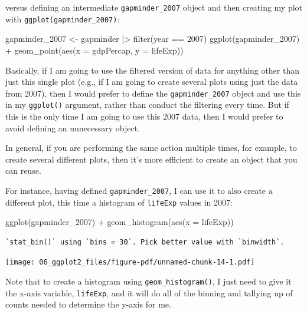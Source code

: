 \documentclass[
  letterpaper,
  DIV=11,
  numbers=noendperiod]{scrreprt}
\newenvironment{Shaded}{\begin{snugshade}}{\end{snugshade}}
\newcommand{\AttributeTok}[1]{\textcolor[rgb]{0.40,0.45,0.13}{#1}}
\newcommand{\DecValTok}[1]{\textcolor[rgb]{0.68,0.00,0.00}{#1}}
\newcommand{\FunctionTok}[1]{\textcolor[rgb]{0.28,0.35,0.67}{#1}}
\newcommand{\NormalTok}[1]{\textcolor[rgb]{0.00,0.23,0.31}{#1}}
\newcommand{\OtherTok}[1]{\textcolor[rgb]{0.00,0.23,0.31}{#1}}
\newcommand{\SpecialCharTok}[1]{\textcolor[rgb]{0.37,0.37,0.37}{#1}}
\begin{document}
versus defining an intermediate \texttt{gapminder\_2007} object and then
creating my plot with \texttt{ggplot(gapminder\_2007)}:

\begin{Shaded}
\begin{Highlighting}[]
\NormalTok{gapminder\_2007 }\OtherTok{\textless{}{-}}\NormalTok{ gapminder }\SpecialCharTok{|\textgreater{}} \FunctionTok{filter}\NormalTok{(year }\SpecialCharTok{==} \DecValTok{2007}\NormalTok{)}
\FunctionTok{ggplot}\NormalTok{(gapminder\_2007) }\SpecialCharTok{+}
  \FunctionTok{geom\_point}\NormalTok{(}\FunctionTok{aes}\NormalTok{(}\AttributeTok{x =}\NormalTok{ gdpPercap, }\AttributeTok{y =}\NormalTok{ lifeExp))}
\end{Highlighting}
\end{Shaded}

Basically, if I am going to use the filtered version of data for
anything other than just this single plot (e.g., if I am going to create
several plots using just the data from 2007), then I would prefer to
define the \texttt{gapminder\_2007} object and use this in my
\texttt{ggplot()} argument, rather than conduct the filtering every
time. But if this is the only time I am going to use this 2007 data,
then I would prefer to avoid defining an unnecessary object.

In general, if you are performing the same action multiple times, for
example, to create several different plots, then it's more efficient to
create an object that you can reuse.

For instance, having defined \texttt{gapminder\_2007}, I can use it to
also create a different plot, this time a histogram of \texttt{lifeExp}
values in 2007:

\begin{Shaded}
\begin{Highlighting}[]
\FunctionTok{ggplot}\NormalTok{(gapminder\_2007) }\SpecialCharTok{+}
  \FunctionTok{geom\_histogram}\NormalTok{(}\FunctionTok{aes}\NormalTok{(}\AttributeTok{x =}\NormalTok{ lifeExp))}
\end{Highlighting}
\end{Shaded}

\begin{verbatim}
`stat_bin()` using `bins = 30`. Pick better value with `binwidth`.
\end{verbatim}

\texttt{[image: 06\_ggplot2\_files/figure-pdf/unnamed-chunk-14-1.pdf]}

Note that to create a histogram using \texttt{geom\_histogram()}, I just
need to give it the x-axis variable, \texttt{lifeExp}, and it will do
all of the binning and tallying up of counts needed to determine the
y-axis for me.
\end{document}
